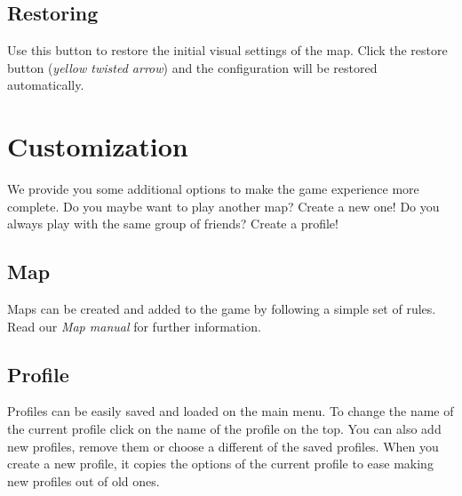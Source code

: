 \documentclass[12pt,a4paper]{article}
\begin{document}
\subsection{Restoring}
Use this button to restore the initial visual settings of the map. Click the restore button ({\it yellow twisted arrow}) and the configuration will be restored automatically.

\section{Customization}
We provide you some additional options to make the game experience more complete. Do you maybe want to play another map? Create a new one! Do you always play with the same group of friends? Create a profile!

\subsection{Map}
Maps can be created and added to the game by following a simple set of rules. Read our {\it Map manual} for further information.

\subsection{Profile}
Profiles can be easily saved and loaded on the main menu. To change
the name of the current profile click on the name of the profile on
the top. You can also add new profiles, remove them or choose a
different of the saved profiles. When you create a new profile, it
copies the options of the current profile to ease making new profiles
out of old ones.

\end{document}
